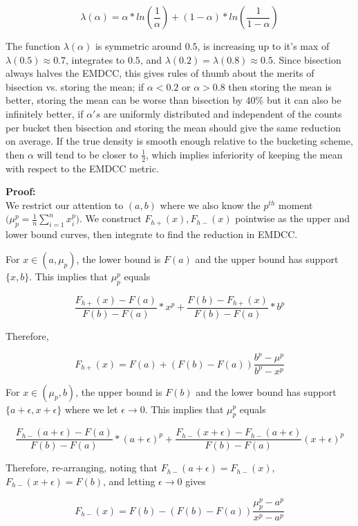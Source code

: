 \documentclass[preprint]{sig-alternate-per}
\begin{document}
$$
\lambda(\alpha) = \alpha * ln(\frac{1}{\alpha}) + (1 - \alpha) * ln(\frac{1}{1-\alpha})
$$

The function $\lambda(\alpha)$ is symmetric around $0.5$, is increasing up to it's max of $\lambda(0.5) \approx 0.7$, integrates to $0.5$, and $\lambda(0.2) = \lambda(0.8) \approx 0.5$.  Since bisection always halves the EMDCC, this gives rules of thumb about the merits of bisection vs. storing the mean; if $\alpha < 0.2$ or $\alpha > 0.8$ then storing the mean is better, storing the mean can be worse than bisection by 40\% but it can also be infinitely better, if $\alpha's$ are uniformly distributed and independent of the counts per bucket then bisection and storing the mean should give the same reduction on average.  If the true density is smooth enough relative to the bucketing scheme, then $\alpha$ will tend to be closer to $\frac{1}{2}$, which implies inferiority of keeping the mean with respect to the EMDCC metric.


\noindent
\textbf{Proof:} \\

We restrict our attention to $(a,b)$ where we also know the $p^{th}$ moment$\big(\mu_p^p = \frac{1}{n} \sum_{i=1}^n x_i^p \big)$.  We construct $F_{h+}(x), F_{h-}(x)$ pointwise as the upper and lower bound curves, then integrate to find the reduction in EMDCC. %

For $x \in (a, \mu_p)$, the lower bound is $F(a)$ and the upper bound has support $\{x, b\}$.  This implies that $\mu_p^p$ equals

$$
\frac{F_{h+}(x)-F(a)}{F(b)-F(a)} * x^p + \frac{F(b)-F_{h+}(x)}{F(b)-F(a)} * b^p
$$

Therefore,

$$
F_{h+}(x) = F(a) + (F(b)-F(a)) \frac{b^p-\mu^p}{b^p-x^p}
$$

For $x \in (\mu_p, b)$, the upper bound is $F(b)$ and the lower bound has support $\{a+\epsilon, x+\epsilon\}$ where we let $\epsilon \rightarrow 0$.  This implies that $\mu_p^p$ equals

$$
\frac{F_{h-}(a+\epsilon)-F(a)}{F(b)-F(a)} * (a+\epsilon)^p + \frac{F_{h-}(x+\epsilon)-F_{h-}(a + \epsilon)}{F(b)-F(a)} (x + \epsilon)^p
$$

Therefore, re-arranging, noting that $F_{h-}(a+\epsilon)=F_{h-}(x)$, $F_{h-}(x+\epsilon)=F(b)$, and letting $\epsilon \rightarrow 0$ gives

$$
F_{h-}(x) = F(b) - (F(b)-F(a)) \frac{\mu_p^p - a^p}{x^p-a^p}
$$
\end{document}

